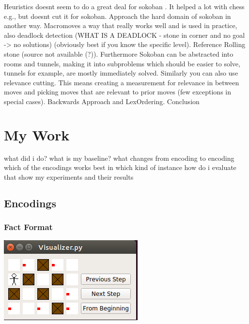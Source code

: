 \documentclass{article}
\begin{document}
Heuristics doesnt seem to do a great deal for sokoban \cite{BoteaHeuristicsVsPlanning}. It helped a lot with chess e.g., but doesnt cut it for sokoban. Approach the hard domain of sokoban in another way. Macromoves a way that really works well and is used in practice, also deadlock detection (WHAT IS A DEADLOCK - stone in corner and no goal -> no solutions) (obviously best if you know the specific level). Reference Rolling stone (source not available (?)). Furthermore Sokoban can be abstracted into rooms and tunnels, making it into subproblems which should be easier to solve, tunnels for example, are mostly immediately solved. Similarly you can also use relevance cutting. This means creating a measurement for relevance in between moves and picking moves that are relevant to prior moves (few exceptions in special cases).
Backwards Approach and LexOrdering.
Conclusion


\section{My Work}
what did i do?
what is my baseline?
what changes from encoding to encoding
which of the encodings works best in which kind of instance
how do i evaluate that
show my experiments and their results
\subsection{Encodings}
\subsubsection{Fact Format}
\includegraphics{Visualizer}

\end{document}
